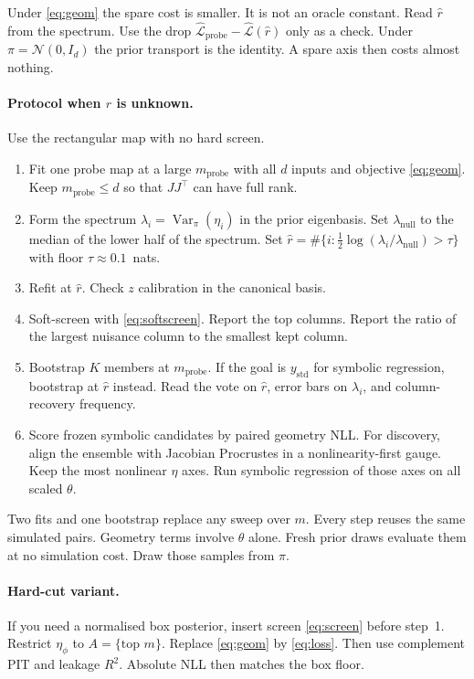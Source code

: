 \documentclass[11pt, letterpaper]{article}
\theoremstyle{definition}
\begin{document}
Under \eqref{eq:geom} the spare cost is smaller.
It is not an oracle constant.
Read $\hat r$ from the spectrum.
Use the drop
$\hat{\mathcal{L}}_{\mathrm{probe}}-\hat{\mathcal{L}}(\hat r)$ only as a
check. Under $\pi=\mathcal{N}(0,I_d)$ the prior transport is the identity.
A spare axis then costs almost nothing.

\paragraph{Protocol when $r$ is unknown.}
Use the rectangular map with no hard screen.
\begin{enumerate}\itemsep0pt
  \item Fit one probe map at a large $m_{\mathrm{probe}}$ with all $d$ inputs
        and objective \eqref{eq:geom}.
        Keep $m_{\mathrm{probe}}\le d$ so that $JJ^\top$ can have full rank.
  \item Form the spectrum $\lambda_i=\operatorname{Var}_\pi(\eta_i)$ in the
        prior eigenbasis.
        Set $\lambda_{\mathrm{null}}$ to the median of the lower half of the
        spectrum.
        Set
        $\hat r=\#\{i:\tfrac12\log(\lambda_i/\lambda_{\mathrm{null}})>\tau\}$
        with floor $\tau\approx 0.1$~nats.
  \item Refit at $\hat r$.
        Check $z$ calibration in the canonical basis.
  \item Soft-screen with \eqref{eq:softscreen}.
        Report the top columns.
        Report the ratio of the largest nuisance column to the smallest kept
        column.
  \item Bootstrap $K$ members at $m_{\mathrm{probe}}$.
        If the goal is $y_{\mathrm{std}}$ for symbolic regression, bootstrap at
        $\hat r$ instead.
        Read the vote on $\hat r$, error bars on $\lambda_i$, and
        column-recovery frequency.
  \item Score frozen symbolic candidates by paired geometry NLL.
        For discovery, align the ensemble with Jacobian Procrustes in a
        nonlinearity-first gauge.
        Keep the most nonlinear $\eta$ axes.
        Run symbolic regression of those axes on all scaled $\theta$.
\end{enumerate}
Two fits and one bootstrap replace any sweep over $m$.
Every step reuses the same simulated pairs.
Geometry terms involve $\theta$ alone.
Fresh prior draws evaluate them at no simulation cost.
Draw those samples from $\pi$.

\paragraph{Hard-cut variant.}
If you need a normalised box posterior, insert screen \eqref{eq:screen}
before step~1.
Restrict $\eta_\phi$ to $A=\{\text{top }m\}$.
Replace \eqref{eq:geom} by \eqref{eq:loss}.
Then use complement PIT and leakage $R^2$.
Absolute NLL then matches the box floor.
\end{document}
